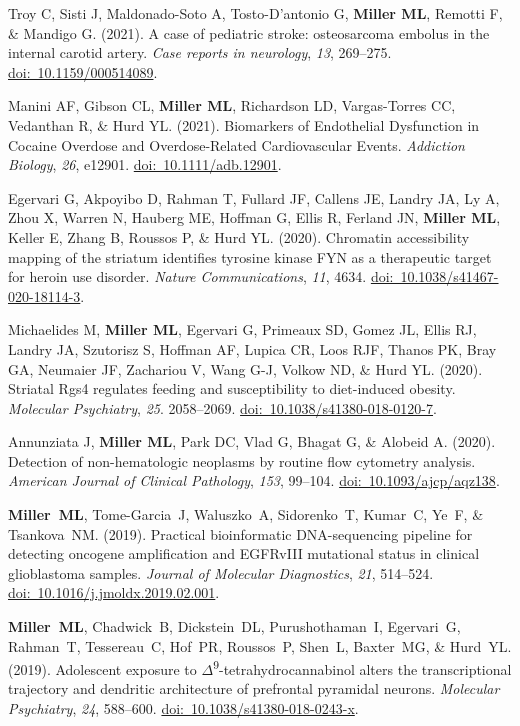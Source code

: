 \documentclass[10pt]{article}
\begin{document}
\begin{description}
\item Troy C, Sisti J, Maldonado-Soto A, Tosto-D'antonio G, \textbf{Miller ML}, Remotti F, \& Mandigo G. (2021). A case of pediatric stroke: osteosarcoma embolus in the internal carotid artery. \textit{Case reports in neurology}, \textit{13}, 269--275. \href{https://doi.org/10.1159/000514089}{doi:~10.1159/000514089}.
\item Manini AF, Gibson CL, \textbf{Miller ML}, Richardson LD, Vargas-Torres CC, Vedanthan R, \& Hurd YL. (2021). Biomarkers of Endothelial Dysfunction in Cocaine Overdose and Overdose-Related Cardiovascular Events. \textit{Addiction Biology}, \textit{26}, e12901. \href{https://doi.org/10.1111/adb.12901}{doi:~10.1111/adb.12901}.
\item Egervari G, Akpoyibo D, Rahman T, Fullard JF, Callens JE, Landry JA, Ly A, Zhou X, Warren N, Hauberg ME, Hoffman G, Ellis R, Ferland JN, \textbf{Miller ML}, Keller E, Zhang B, Roussos P, \& Hurd YL. (2020). Chromatin accessibility mapping of the striatum identifies tyrosine kinase FYN as a therapeutic target for heroin use disorder. \textit{Nature Communications}, \textit{11}, 4634. \href{https://doi.org/10.1038/s41467-020-18114-3}{doi:~10.1038/s41467-020-18114-3}.
\item Michaelides M, \textbf{Miller ML}, Egervari G, Primeaux SD, Gomez JL, Ellis RJ, Landry JA, Szutorisz S, Hoffman AF, Lupica CR, Loos RJF, Thanos PK, Bray GA, Neumaier JF, Zachariou V, Wang G-J, Volkow ND, \& Hurd YL. (2020). Striatal Rgs4 regulates feeding and susceptibility to diet-induced obesity. \textit{Molecular Psychiatry}, \textit{25}. 2058--2069. \href{https://doi.org/10.1038/s41380-018-0120-7}{doi:~10.1038/s41380-018-0120-7}.
\item Annunziata J, \textbf{Miller ML}, Park DC, Vlad G, Bhagat G, \& Alobeid A. (2020). Detection of non-hematologic neoplasms by routine flow cytometry analysis. \textit{American Journal of Clinical Pathology}, \textit{153}, 99--104. \href{https://doi.org/10.1093/ajcp/aqz138}{doi:~10.1093/ajcp/aqz138}.
\item \textbf{Miller~ML}, Tome-Garcia~J, Waluszko~A, Sidorenko~T, Kumar~C, Ye~F, \& Tsankova~NM. (2019). Practical bioinformatic DNA-sequencing pipeline for detecting oncogene amplification and EGFRvIII mutational status in clinical glioblastoma samples. \textit{Journal of Molecular Diagnostics}, \textit{21}, 514--524. \href{https://doi.org/10.1016/j.jmoldx.2019.02.001}{doi:~10.1016/j.jmoldx.2019.02.001}.
\item \textbf{Miller~ML}, Chadwick~B, Dickstein~DL, Purushothaman~I, Egervari~G, Rahman~T, Tessereau~C, Hof~PR, Roussos~P, Shen~L, Baxter~MG, \& Hurd~YL. (2019). Adolescent exposure to $\Delta$\textsuperscript{9}-tetrahydrocannabinol alters the transcriptional trajectory and dendritic architecture of prefrontal pyramidal neurons. \textit{Molecular Psychiatry}, \textit{24}, 588--600. \href{https://doi.org/10.1038/s41380-018-0243-x}{doi:~10.1038/s41380-018-0243-x}.

\end{description}
\end{document}
